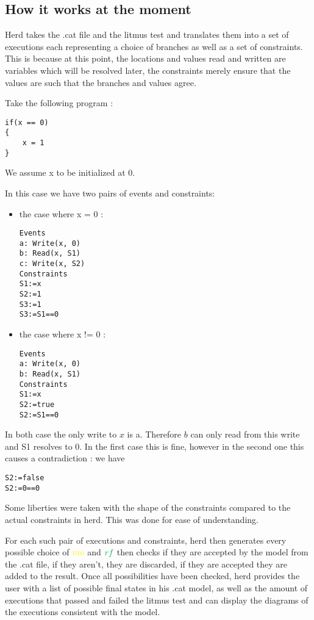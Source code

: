 \documentclass[a4,12pt]{article}
\newcommand{\mo}{{\color{Yellow}mo}}
\newcommand{\rf}{{\color{Green}rf}}
\begin{document}
\subsection{How it works at the moment}

Herd takes the .cat file and the litmus test and translates them into a set of executions each representing a choice of branches as well as a set of constraints. This is because at this point, the locations and values read and written are variables which will be resolved later, the constraints merely ensure that the values are such that the branches and values agree.

Take the following program :

\begin{lstlisting}
if(x == 0)
{
	x = 1
}
\end{lstlisting}
\footnotesize{We assume x to be initialized at 0.}

In this case we have two pairs of events and constraints:
\begin{itemize}
\item the case where x = 0 :\begin{lstlisting}
Events
a: Write(x, 0)
b: Read(x, S1)
c: Write(x, S2)
Constraints
S1:=x
S2:=1
S3:=1
S3:=S1==0
\end{lstlisting}
\vfill
\item the case where x != 0 : \begin{lstlisting}
Events
a: Write(x, 0)
b: Read(x, S1)
Constraints
S1:=x
S2:=true
S2:=S1==0
\end{lstlisting}
\end{itemize}

In both case the only write to $x$ is a. Therefore $b$ can only read from this write and S1 resolves to 0. In the first case this is fine, however in the second one this causes a contradiction : we have
\begin{lstlisting}
S2:=false
S2:=0==0
\end{lstlisting}
\footnotesize{Some liberties were taken with the shape of the constraints compared to the actual constraints in herd. This was done for ease of understanding.}

 For each such pair of executions and constraints, herd then generates every possible choice of $\mo$ and $\rf$ then checks if they are accepted by the model from the .cat file, if they aren't, they are discarded, if they are accepted they are added to the result. Once all possibilities have been checked, herd provides the user with a list of possible final states in his .cat model, as well as the amount of executions that passed and failed the litmus test and can display the diagrams of the executions consistent with the model.
\end{document}
